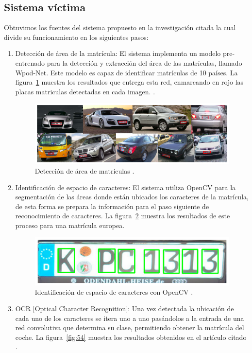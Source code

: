 \subsection{Sistema víctima}
Obtuvimos los fuentes del sistema propuesto en la investigación citada \parencite{r60} la cual divide su funcionamiento en los siguientes pasos:
\begin{enumerate}
    \item Detección de área de la matrícula:
        El sistema implementa un modelo pre-entrenado para la detección y extracción del área de las matrículas, llamado Wpod-Net. Este modelo es capaz de identificar matrículas de 10 países. La figura~\ref{fig:52} muestra los resultados que entrega esta red, enmarcando en rojo las placas matriculas detectadas en cada imagen. .
        
        \begin{figure}[!h]
        \centering
        \includegraphics[scale = 0.9]{Figures/figura_52.PNG}
        \decoRule
        \caption[Detección de placas matrículas]{Detección de área de matrículas \parencite{r60}.}
        \label{fig:52}
        \end{figure}


    \item Identificación de espacio de caracteres:
        El sistema utiliza OpenCV para la segmentación de las áreas donde están ubicados los caracteres de la matrícula, de esta forma se prepara la información para el paso siguiente de reconocimiento de caracteres. La figura~\ref{fig:53} muestra los resultados de este proceso para una matrícula europea.

        \begin{figure}[!h]
        \centering
        \includegraphics[scale = 1]{Figures/figura_53.PNG}
        \decoRule
        \caption[Identificación de espacio de caracteres en placas matrículas]{ Identificación de espacio de caracteres con OpenCV \parencite{r60}.}
        \label{fig:53}
        \end{figure}
    \item OCR [Optical Character Recognition]:
        Una vez detectada la ubicación de cada uno de los caracteres se itera uno a uno pasándolos a la entrada de una red convolutiva que determina su clase, permitiendo obtener la matrícula del coche. La figura~\ref{fig:54} muestra los resultados obtenidos en el artículo citado \parencite{r60}.


\end{enumerate}
